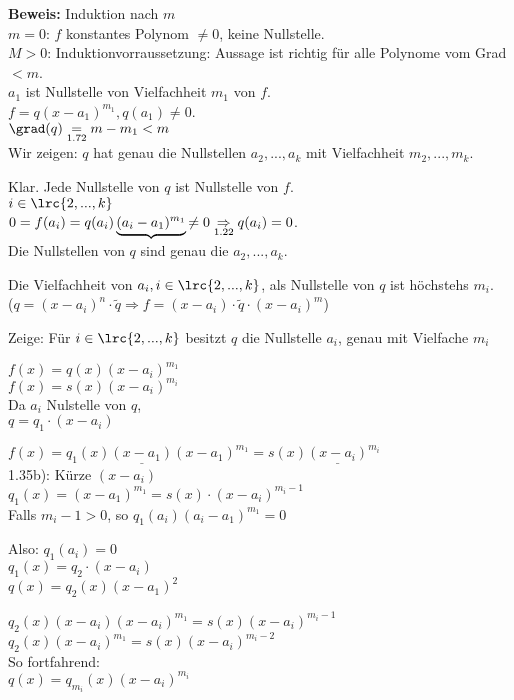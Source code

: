 	\textbf{Beweis:} Induktion nach $m$\\
	$m=0$: $f$ konstantes Polynom $\neq 0$, keine Nullstelle.\\
	$M>0$: Induktionvorraussetzung: Aussage ist richtig für alle Polynome vom Grad $<m$.\\
	$a_1$ ist Nullstelle von Vielfachheit $m_1$ von $f$.\\
	$f=q(x-a_1)^{m_1},q(a_1)\neq 0$.\\
	$\grad(q)\underset{\mbox{\scriptsize 1.72}}{=}m-m_1<m$\\
	Wir zeigen: $q$ hat genau die Nullstellen $a_2,...,a_k$ mit Vielfachheit $m_2,...,m_k$.

	Klar. Jede Nullstelle von $q$ ist Nullstelle von $f$.\\
	$i\in\lrc{2,...,k}$\\
	$0=f(a_i)=q(a_i)\underbrace{(a_i-a_1)^{m_1}}{\neq 0}\underset{\mbox{\scriptsize 1.22}}{\Rightarrow} q(a_i)=0$.\\
	Die Nullstellen von $q$ sind genau die $a_2,...,a_k$.

	Die Vielfachheit von $a_i,i\in\lrc{2,...,k}$, als Nullstelle von $q$ ist höchstehs $m_i$.\\
	($q=(x-a_i)^n\cdot\tilde{q}\Rightarrow f=(x-a_i)\cdot\tilde{q}\cdot(x-a_i)^m$)

	Zeige: Für $i\in\lrc{2,...,k}$ besitzt $q$ die Nullstelle $a_i$, genau mit Vielfache $m_i$

	$f(x)=q(x)(x-a_i)^{m_1}$\\
	$f(x)=s(x)(x-a_i)^{m_i}$\\
	Da $a_i$ Nulstelle von $q$,\\
	$q=q_1\cdot(x-a_i)$

	$f(x)=q_1(x)\underline{(x-a_1)}(x-a_1)^{m_1}=s(x)\underline{(x-a_i)}^{m_i}$\\
	1.35b): Kürze $(x-a_i)$\\
	$q_1(x)=(x-a_1)^{m_1}=s(x)\cdot(x-a_i)^{m_i-1}$\\
	Falls $m_i-1>0$, so $q_1(a_i)(a_i-a_1)^{m_1}=0$

	Also: $q_1(a_i)=0$\\
	$q_1(x)=q_2\cdot(x-a_i)$\\
	$q(x)=q_2(x)(x-a_1)^2$

	$q_2(x)(x-a_i)(x-a_i)^{m_1}=s(x)(x-a_i)^{m_i-1}$\\
	$q_2(x)(x-a_i)^{m_1}=s(x)(x-a_i)^{m_i-2}$\\
	So fortfahrend:\\
	$q(x)=q_{m_i}(x)(x-a_i)^{m_i}$

